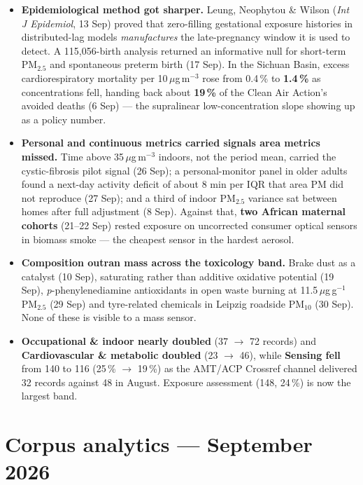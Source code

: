 \documentclass[10pt]{article}
\begin{document}
\begin{itemize}
\item \textbf{Epidemiological method got sharper.} Leung, Neophytou \& Wilson (\textit{Int J
Epidemiol}, 13 Sep) proved that zero-filling gestational exposure histories in distributed-lag
models \emph{manufactures} the late-pregnancy window it is used to detect. A 115,056-birth
analysis returned an informative null for short-term PM$_{2.5}$ and spontaneous preterm birth (17
Sep). In the Sichuan Basin, excess cardiorespiratory mortality per 10\,$\mu$g\,m$^{-3}$ rose from 0.4\,\%
to \textbf{1.4\,\%} as concentrations fell, handing back about \textbf{19\,\%} of the Clean Air Action's
avoided deaths (6 Sep) --- the supralinear low-concentration slope showing up as a policy number.

\item \textbf{Personal and continuous metrics carried signals area metrics missed.} Time above
35\,$\mu$g\,m$^{-3}$ indoors, not the period mean, carried the cystic-fibrosis pilot signal (26
Sep); a personal-monitor panel in older adults found a next-day activity deficit of about 8 min per
IQR that area PM did not reproduce (27 Sep); and a third of indoor PM$_{2.5}$ variance sat between
homes after full adjustment (8 Sep). Against that, \textbf{two African maternal cohorts} (21--22
Sep) rested exposure on uncorrected consumer optical sensors in biomass smoke --- the cheapest
sensor in the hardest aerosol.

\item \textbf{Composition outran mass across the toxicology band.} Brake dust as a catalyst
(10 Sep), saturating rather than additive oxidative potential (19 Sep), \textit{p}-phenylenediamine
antioxidants in open waste burning at 11.5\,$\mu$g\,g$^{-1}$ PM$_{2.5}$ (29 Sep) and tyre-related
chemicals in Leipzig roadside PM$_{10}$ (30 Sep). None of these is visible to a mass sensor.

\item \textbf{Occupational \& indoor nearly doubled} (37 $\rightarrow$ 72 records) and
\textbf{Cardiovascular \& metabolic doubled} (23 $\rightarrow$ 46), while \textbf{Sensing fell} from
140 to 116 (25\,\% $\rightarrow$ 19\,\%) as the AMT/ACP Crossref channel delivered 32 records against
48 in August. Exposure assessment (148, 24\,\%) is now the largest band.
\end{itemize}

\clearpage

\section*{\sffamily\bfseries\color{Deep}Corpus analytics --- September 2026}
\vspace{-1.5mm}{\color{Coral}\rule{\linewidth}{1.1pt}}\vspace{2.5mm}
\end{document}
